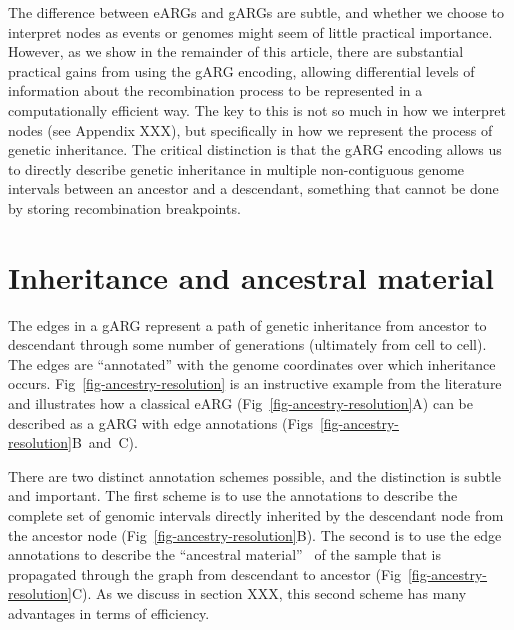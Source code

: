 \documentclass{article}
\begin{document}
The difference between eARGs and gARGs are subtle, and whether
we choose to interpret nodes as events or genomes
might seem of little practical importance.
However, as we show in the remainder of this article,
there are substantial practical gains
from using the gARG encoding, allowing differential
levels of information about the recombination process to be
represented in a computationally efficient way.
The key to this is not so much in how we interpret nodes
(see Appendix XXX), but specifically in how
we represent the process of genetic inheritance.
The critical distinction is that
the gARG encoding allows us to directly describe
genetic inheritance in multiple non-contiguous genome intervals
between an ancestor and a descendant, something that
cannot be done by storing recombination breakpoints.

\section*{Inheritance and ancestral material}\label{Ancestry_resolution}
The edges in a gARG represent a path of genetic inheritance from
ancestor to descendant through some
number of generations (ultimately from cell to cell). The edges are ``annotated''
with the genome coordinates over which inheritance occurs.
Fig~\ref{fig-ancestry-resolution} is an instructive example
from the literature \citep{wiuf1999recombination} and illustrates
how a classical eARG (Fig~\ref{fig-ancestry-resolution}A) can be described as
a gARG with edge annotations (Figs~\ref{fig-ancestry-resolution}B~and~C).

There are two distinct annotation schemes possible, and the distinction is subtle
and important. The first scheme is to use the annotations to describe the complete
set of genomic intervals directly inherited by the descendant node from the ancestor
node (Fig~\ref{fig-ancestry-resolution}B). The second is to use the edge annotations to
describe the ``ancestral material''~\citep{wiuf1999ancestry,wiuf1999recombination}
of the sample that is propagated through
the graph from descendant to ancestor (Fig~\ref{fig-ancestry-resolution}C).
As we discuss in section XXX, this second scheme has many advantages
in terms of efficiency.
\end{document}
